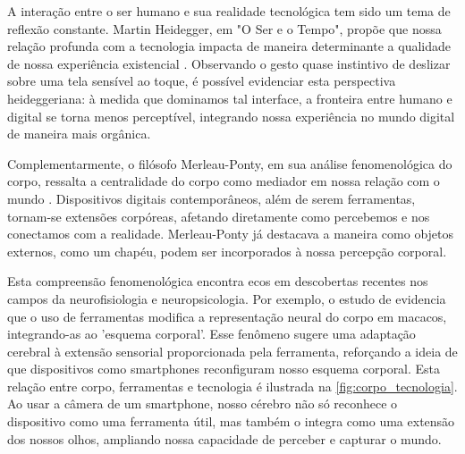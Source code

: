 A interação entre o ser humano e sua realidade tecnológica tem sido um tema de reflexão constante. Martin Heidegger, em "O Ser e o Tempo", propõe que nossa relação profunda com a tecnologia impacta de maneira determinante a qualidade de nossa experiência existencial \cite{2012_Silva_DISSERTATION}. Observando o gesto quase instintivo de deslizar sobre uma tela sensível ao toque, é possível evidenciar esta perspectiva heideggeriana: à medida que dominamos tal interface, a fronteira entre humano e digital se torna menos perceptível, integrando nossa experiência no mundo digital de maneira mais orgânica.

Complementarmente, o filósofo Merleau-Ponty, em sua análise fenomenológica do corpo, ressalta a centralidade do corpo como mediador em nossa relação com o mundo \cite{2011_MerleauPonty_BOOK}. Dispositivos digitais contemporâneos, além de serem ferramentas, tornam-se extensões corpóreas, afetando diretamente como percebemos e nos conectamos com a realidade. Merleau-Ponty já destacava a maneira como objetos externos, como um chapéu, podem ser incorporados à nossa percepção corporal.

Esta compreensão fenomenológica encontra ecos em descobertas recentes nos campos da neurofisiologia e neuropsicologia. Por exemplo, o estudo de  evidencia que o uso de ferramentas modifica a representação neural do corpo em macacos, integrando-as ao 'esquema corporal'. Esse fenômeno sugere uma adaptação cerebral à extensão sensorial proporcionada pela ferramenta, reforçando a ideia de que dispositivos como smartphones reconfiguram nosso esquema corporal. Esta relação entre corpo, ferramentas e tecnologia é ilustrada na \autoref{fig:corpo_tecnologia}. Ao usar a câmera de um smartphone, nosso cérebro não só reconhece o dispositivo como uma ferramenta útil, mas também o integra como uma extensão dos nossos olhos, ampliando nossa capacidade de perceber e capturar o mundo.

